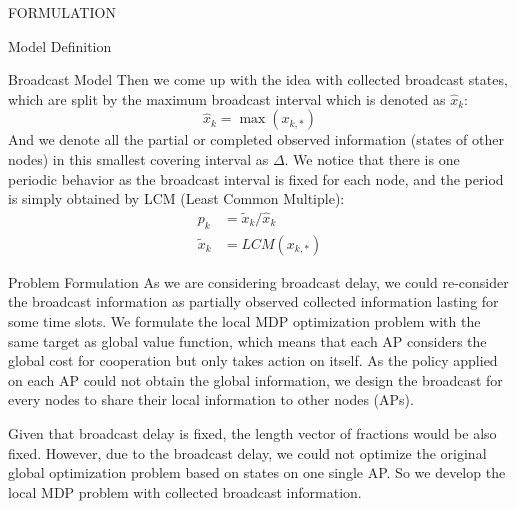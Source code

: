 \documentclass[10pt, conference, letterpaper]{IEEEtran}
\begin{document}
\begin{section}{FORMULATION}
\begin{subsection}{Model Definition}
\begin{subsubsection}{Broadcast Model}
                Then we come up with the idea with collected broadcast states, which are split by the maximum broadcast interval which is denoted as $\hat{x}_k$:
                $$
                \hat{x}_k = \max(x_{k,*})
                $$
                And we denote all the partial or completed observed information (states of other nodes) in this smallest covering interval as $\Delta$.
                We notice that there is one periodic behavior as the broadcast interval is fixed for each node, and the period is simply obtained by LCM (Least Common Multiple):
                \begin{align*}
                    p_{k} &= \tilde{x}_k/\hat{x}_k
                    \\
                    \tilde{x}_k &= LCM(x_{k,*})
                \end{align*}
            \end{subsubsection}

        \end{subsection}

        \begin{subsection}{Problem Formulation}
            As we are considering broadcast delay, we could re-consider the broadcast information as partially observed collected information lasting for some time slots. We formulate the local MDP optimization problem with the same target as global value function, which means that each AP considers the global cost for cooperation but only takes action on itself. As the policy applied on each AP could not obtain the global information, we design the broadcast for every nodes to share their local information to other nodes (APs).
            
            Given that broadcast delay is fixed, the length vector of fractions would be also fixed.
            However, due to the broadcast delay, we could not optimize the original global optimization problem based on states on one single AP. So we develop the local MDP problem with collected broadcast information.


\end{subsection}
\end{section}
\end{document}
